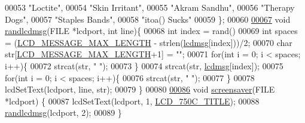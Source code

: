 \begin{DoxyCode}
00053     \textcolor{stringliteral}{"Loctite"},
00054     \textcolor{stringliteral}{"Skin Irritant"},
00055     \textcolor{stringliteral}{"Akram Sandhu"},
00056     \textcolor{stringliteral}{"Therapy Dogs"},
00057     \textcolor{stringliteral}{"Staples Bands"},
00058     \textcolor{stringliteral}{"itoa() Sucks"}
00059 \};
00060 
\hypertarget{lcdmsg_8c_source.tex_l00067}{}\hyperlink{lcdmsg_8h_aabe33dfb797df5997c5e03078591aa81}{00067} \textcolor{keywordtype}{void} \hyperlink{lcdmsg_8c_aabe33dfb797df5997c5e03078591aa81}{randlcdmsg}(FILE *lcdport, \textcolor{keywordtype}{int} line)\{
00068     \textcolor{keywordtype}{int} index = rand() %
00069     \textcolor{keywordtype}{int} spaces = (\hyperlink{lcdmsg_8h_abe4c4b70fc6f44ae3680e5b2c68cdd00}{LCD\_MESSAGE\_MAX\_LENGTH} - strlen(\hyperlink{lcdmsg_8c_abbcf1856a4c9063200ef3f4131fd05f5}{lcdmsg}[index]))/2;
00070     \textcolor{keywordtype}{char} str[\hyperlink{lcdmsg_8h_abe4c4b70fc6f44ae3680e5b2c68cdd00}{LCD\_MESSAGE\_MAX\_LENGTH}+1] = \textcolor{stringliteral}{""};
00071     \textcolor{keywordflow}{for}(\textcolor{keywordtype}{int} i = 0; i < spaces; i++)\{
00072         strcat(str, \textcolor{stringliteral}{" "});
00073     \}
00074     strcat(str, \hyperlink{lcdmsg_8c_abbcf1856a4c9063200ef3f4131fd05f5}{lcdmsg}[index]);
00075     \textcolor{keywordflow}{for}(\textcolor{keywordtype}{int} i = 0; i < spaces; i++)\{
00076         strcat(str, \textcolor{stringliteral}{" "});
00077     \}
00078     lcdSetText(lcdport, line, str);
00079 \}
00080 
\hypertarget{lcdmsg_8c_source.tex_l00086}{}\hyperlink{lcdmsg_8h_acc19fe50b302412c894538965e77cb8b}{00086} \textcolor{keywordtype}{void} \hyperlink{lcdmsg_8c_acc19fe50b302412c894538965e77cb8b}{screensaver}(FILE *lcdport) \{
00087     lcdSetText(lcdport, 1, \hyperlink{lcdmsg_8h_aa9575881ef196e5c94e60d183742eee7}{LCD\_750C\_TITLE});
00088     \hyperlink{lcdmsg_8c_aabe33dfb797df5997c5e03078591aa81}{randlcdmsg}(lcdport, 2);
00089 \}
\end{DoxyCode}
